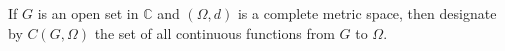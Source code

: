 If $G$ is an open set in $\mathbb{C}$ and $(\Omega, d)$ is a complete metric space, then designate by $C(G, \Omega)$ the set of all continuous functions from $G$ to $\Omega$.
